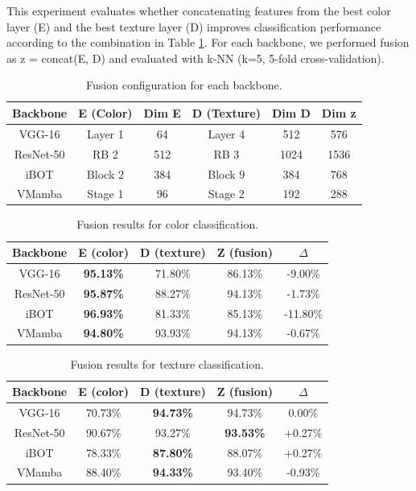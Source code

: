 \documentclass[conference]{IEEEtran}
\begin{document}
This experiment evaluates whether concatenating features from the best color layer (E) and the best texture layer (D) improves classification performance according to the combination in Table \ref{tab5}. For each backbone, we performed fusion as z = concat(E, D) and evaluated with k-NN (k=5, 5-fold cross-validation).

\begin{table}[htbp]
\caption{Fusion configuration for each backbone.}
\begin{center}
\begin{tabular}{c|c|c|c|c|c}
\hline
\textbf{Backbone} & \textbf{E (Color)} & \textbf{Dim E} & \textbf{D (Texture)} & \textbf{Dim D} & \textbf{Dim z}\\
\hline
VGG-16 & Layer 1 & 64 & Layer 4 & 512 & 576 \\
ResNet-50 & RB 2 & 512 & RB 3 & 1024 & 1536 \\
iBOT & Block 2 & 384 & Block 9 & 384 & 768 \\
VMamba & Stage 1 & 96 & Stage 2 & 192 & 288 \\
\hline
\end{tabular}
\label{tab5}
\end{center}
\end{table}

\begin{table}[htbp]
\caption{Fusion results for color classification.}
\begin{center}
\begin{tabular}{c|c|c|c|c}
\hline
\textbf{Backbone} & \textbf{E (color)} & \textbf{D (texture)} & \textbf{Z (fusion)} & \textbf{$\Delta$}\\
\hline
VGG-16 & \textbf{95.13\%} & 71.80\% & 86.13\% & -9.00\% \\
ResNet-50 & \textbf{95.87\%} & 88.27\% & 94.13\% & -1.73\% \\
iBOT & \textbf{96.93\%} & 81.33\% & 85.13\% & -11.80\% \\
VMamba & \textbf{94.80\%} & 93.93\% & 94.13\% & -0.67\% \\
\hline
\end{tabular}
\label{tab6}
\end{center}
\end{table}

\begin{table}[htbp]
\caption{Fusion results for texture classification.}
\begin{center}
\begin{tabular}{c|c|c|c|c}
\hline
\textbf{Backbone} & \textbf{E (color)} & \textbf{D (texture)} & \textbf{Z (fusion)} & \textbf{$\Delta$}\\
\hline
VGG-16 & 70.73\% & \textbf{94.73\%} & 94.73\% & 0.00\% \\
ResNet-50 & 90.67\% & 93.27\% & \textbf{93.53\%} & +0.27\% \\
iBOT & 78.33\% & \textbf{87.80\%} & 88.07\% & +0.27\% \\
VMamba & 88.40\% & \textbf{94.33\%} & 93.40\% & -0.93\% \\
\hline
\end{tabular}
\label{tab7}
\end{center}
\end{table}
\end{document}
